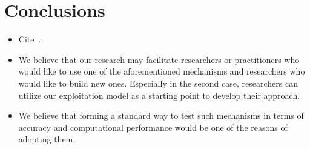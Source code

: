 \documentclass[conference]{IEEEtran}
\begin{document}

\section{Conclusions}

\begin{itemize}
\item Cite~\cite{DKH14}.
\item We believe that our research may facilitate researchers
or practitioners who would like to use one of the
aforementioned mechanisms and researchers who would like
to build new ones. Especially in the second case,
researchers can utilize our exploitation model as a
starting point to develop their approach.
\item We believe that forming a
standard way to test such mechanisms in terms
of accuracy and computational performance
would be one of the reasons of adopting them.
\end{itemize}



\end{document}
